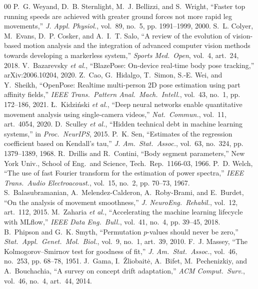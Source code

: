 \documentclass[conference]{IEEEtran}
\begin{document}
\begin{thebibliography}{00}
 P.~G. Weyand, D.~B. Sternlight, M.~J. Bellizzi, and S.~Wright, ``Faster top running speeds are achieved with greater ground forces not more rapid leg movements,'' \emph{J. Appl. Physiol.}, vol.~89, no.~5, pp. 1991--1999, 2000.
 S.~L. Colyer, M.~Evans, D.~P. Cosker, and A.~I.~T. Salo, ``A review of the evolution of vision-based motion analysis and the integration of advanced computer vision methods towards developing a markerless system,'' \emph{Sports Med.\ Open}, vol.~4, art.~24, 2018.
 V.~Bazarevsky \emph{et al.}, ``BlazePose: On-device real-time body pose tracking,'' arXiv:2006.10204, 2020.
 Z.~Cao, G.~Hidalgo, T.~Simon, S.-E. Wei, and Y.~Sheikh, ``OpenPose: Realtime multi-person 2D pose estimation using part affinity fields,'' \emph{IEEE Trans.\ Pattern Anal.\ Mach.\ Intell.}, vol.~43, no.~1, pp. 172--186, 2021.
 {\L}.~Kidzi{\'n}ski \emph{et al.}, ``Deep neural networks enable quantitative movement analysis using single-camera videos,'' \emph{Nat.\ Commun.}, vol.~11, art.~4054, 2020.
 D.~Sculley \emph{et al.}, ``Hidden technical debt in machine learning systems,'' in \emph{Proc.\ NeurIPS}, 2015.
 P.~K. Sen, ``Estimates of the regression coefficient based on Kendall's tau,'' \emph{J. Am.\ Stat.\ Assoc.}, vol.~63, no.~324, pp. 1379--1389, 1968.
 R.~Drillis and R.~Contini, ``Body segment parameters,'' New York Univ., School of Eng.\ and Science, Tech.\ Rep.\ 1166-03, 1966.
 P.~D. Welch, ``The use of fast Fourier transform for the estimation of power spectra,'' \emph{IEEE Trans.\ Audio Electroacoust.}, vol.~15, no.~2, pp. 70--73, 1967.
 S.~Balasubramanian, A.~Melendez-Calderon, A.~Roby-Brami, and E.~Burdet, ``On the analysis of movement smoothness,'' \emph{J. NeuroEng.\ Rehabil.}, vol.~12, art.~112, 2015.
 M.~Zaharia \emph{et al.}, ``Accelerating the machine learning lifecycle with MLflow,'' \emph{IEEE Data Eng.\ Bull.}, vol.~41, no.~4, pp. 39--45, 2018.
 B.~Phipson and G.~K. Smyth, ``Permutation $p$-values should never be zero,'' \emph{Stat.\ Appl.\ Genet.\ Mol.\ Biol.}, vol.~9, no.~1, art.~39, 2010.
 F.~J. Massey, ``The Kolmogorov--Smirnov test for goodness of fit,'' \emph{J. Am.\ Stat.\ Assoc.}, vol.~46, no.~253, pp. 68--78, 1951.
 J.~Gama, I.~{\v Z}liobait{\.e}, A.~Bifet, M.~Pechenizkiy, and A.~Bouchachia, ``A survey on concept drift adaptation,'' \emph{ACM Comput.\ Surv.}, vol.~46, no.~4, art.~44, 2014.
\end{thebibliography}
\end{document}
